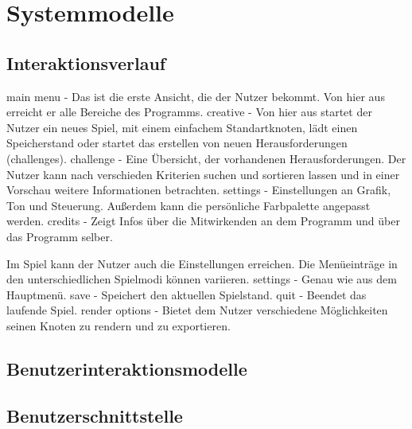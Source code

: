 \chapter{Systemmodelle}


\section{Interaktionsverlauf}
    main menu - Das ist die erste Ansicht, die der Nutzer bekommt. Von hier aus erreicht er alle Bereiche des Programms.
    creative - Von hier aus startet der Nutzer ein neues Spiel, mit einem einfachem Standartknoten, lädt einen Speicherstand oder startet das erstellen von neuen Herausforderungen (challenges).
    challenge - Eine Übersicht, der vorhandenen Herausforderungen. Der Nutzer kann nach verschieden Kriterien suchen und sortieren lassen und in einer Vorschau weitere Informationen betrachten.
    settings - Einstellungen an Grafik, Ton und Steuerung. Außerdem kann die persönliche Farbpalette angepasst werden.
    credits - Zeigt Infos über die Mitwirkenden an dem Programm und über das Programm selber.
	\begin{figure}[htbp]
	  \centering
	  
	\end{figure}
	Im Spiel kann der Nutzer auch die Einstellungen erreichen. Die Menüeinträge in den unterschiedlichen Spielmodi können variieren.
	settings - Genau wie aus dem Hauptmenü.
	save - Speichert den aktuellen Spielstand.
	quit - Beendet das laufende Spiel.
	render options - Bietet dem Nutzer verschiedene Möglichkeiten seinen Knoten zu rendern und zu exportieren.
    \begin{figure}[htbp]
	  \centering
	  
	\end{figure}


\section{Benutzerinteraktionsmodelle}

	\begin{figure}[htbp]
	  \centering
	  
	\end{figure}


\section{Benutzerschnittstelle}

	\begin{figure}[htbp]
	  \centering
	  
	\end{figure}

	\begin{figure}[htbp]
	  \centering
	  
	\end{figure}
